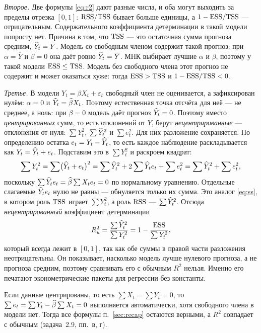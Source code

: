 \emph{Второе.} Две формулы \eqref{eq:r2} дают разные числа, и оба могут выходить
за пределы отрезка $[0,1]$: $\mathrm{RSS}/\mathrm{TSS}$ бывает больше единицы, а
$1 - \mathrm{ESS}/\mathrm{TSS}$ — отрицательным. Содержательного коэффициента детерминации в
такой модели попросту нет. Причина в том, что $\mathrm{TSS}$ — это остаточная сумма
прогноза средним, $\widehat{Y}_t = \overline{Y}$. Модель со свободным членом содержит
такой прогноз: при $\alpha = \overline{Y}$ и $\beta = 0$ она даёт ровно
$\widehat{Y}_t = \overline{Y}$. МНК выбирает лучшие $\alpha$ и $\beta$, поэтому у такой
модели $\mathrm{ESS} \le \mathrm{TSS}$. Модель без свободного члена этот прогноз не содержит и может оказаться хуже: тогда $\mathrm{ESS} > \mathrm{TSS}$ и
$1 - \mathrm{ESS}/\mathrm{TSS} < 0$.

\emph{Третье.} В модели $Y_t = \beta X_t + \varepsilon_t$ свободный член не
оценивается, а зафиксирован нулём: $\alpha = 0$ и $\widehat{Y}_t = \widehat{\beta} X_t$. Поэтому
естественная точка отсчёта для неё — не среднее, а ноль: при $\beta = 0$ модель
даёт прогноз $\widehat{Y}_t = 0$.
Поэтому вместо \emph{центрированных} сумм, то есть отклонений от
$\overline{Y}$, берут \emph{нецентрированные} — отклонения от нуля:
$\sum Y_t^2$, $\sum \widehat{Y}_t^2$ и $\sum e_t^2$. Для них разложение сохраняется.
По определению остатка $e_t = Y_t - \widehat{Y}_t$, то есть каждое наблюдение
раскладывается как $Y_t = \widehat{Y}_t + e_t$. Подставим это в $\sum Y_t^2$ и раскроем
квадрат:
\[
  \sum Y_t^2 = \sum\bigl(\widehat{Y}_t + e_t\bigr)^2
  = \sum \widehat{Y}_t^2 + 2\sum \widehat{Y}_te_t + \sum e_t^2
  = \sum \widehat{Y}_t^2 + \sum e_t^2 ,
\]
поскольку $\sum \widehat{Y}_te_t = \widehat{\beta}\sum X_te_t = 0$ по нормальному уравнению.
Отдельные слагаемые $\widehat{Y}_te_t$ нулю не равны — обнуляется только их сумма. Это
аналог \eqref{eq:ss}, в
котором роль $\mathrm{TSS}$ играет $\sum Y_t^2$, а роль $\mathrm{RSS}$ — $\sum \widehat{Y}_t^2$.
Отсюда \emph{нецентрированный} коэффициент детерминации
\begin{equation}
  R_u^2 = \frac{\sum \widehat{Y}_t^2}{\sum Y_t^2} = 1 - \frac{\mathrm{ESS}}{\sum Y_t^2},
  \label{eq:ru2}
\end{equation}
который всегда лежит в $[0,1]$, так как обе суммы в правой части разложения
неотрицательны. Он показывает, насколько модель лучше нулевого прогноза, а не
прогноза средним, поэтому сравнивать его с обычным $R^2$ нельзя. Именно его
печатают эконометрические пакеты для регрессии без константы.

\begin{remark}
Если данные центрированы, то есть $\sum X_t = \sum Y_t = 0$, то
$\sum e_t = \sum Y_t - \widehat{\beta}\sum X_t = 0$ выполняется автоматически, хотя
свободного члена в модели нет. Тогда все формулы п.~\ref{sec:recap} остаются
верными, а $R^2$ совпадает с обычным (задача~2.9, пп.~в, г).
\end{remark}

